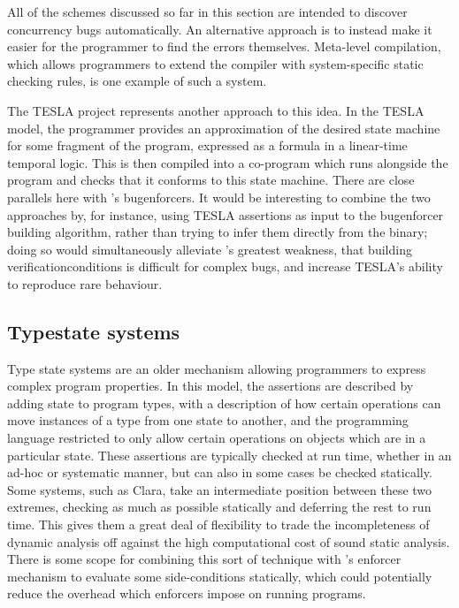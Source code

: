 All of the schemes discussed so far in this section are intended to
discover concurrency bugs automatically.  An alternative approach is
to instead make it easier for the programmer to find the errors
themselves.  Meta-level compilation\cite{Engler2000a}, which allows
programmers to extend the compiler with system-specific static
checking rules, is one example of such a system.

The TESLA project\cite{Watson2013}
represents another approach to this idea.  In the TESLA model, the
programmer provides an approximation of the desired state machine for
some fragment of the program, expressed as a formula in a linear-time
temporal logic.  This is then compiled into a co-program which runs
alongside the program and checks that it conforms to this state
machine.  There are close parallels here with {\technique}'s
\glspl{bugenforcer}.  It would be interesting to combine the two
approaches by, for instance, using TESLA assertions as input to the
\gls{bugenforcer} building algorithm, rather than trying to infer them
directly from the binary; doing so would simultaneously alleviate
{\technique}'s greatest weakness, that building
\glspl{verificationcondition} is difficult for complex bugs, and
increase TESLA's ability to reproduce rare behaviour.

\subsection{Typestate systems}

Type state systems\cite{Strom1986a} are an older mechanism allowing
programmers to express complex program properties.  In this model, the
assertions are described by adding state to program types, with a
description of how certain operations can move instances of a type
from one state to another, and the programming language restricted to
only allow certain operations on objects which are in a particular
state.  These assertions are typically checked at run
time\cite{Wolff2011}, whether in an
ad-hoc\cite[pages~305--314]{Gamma1995} or systematic\cite{Aldrich2009}
manner, but can also in some cases be checked
statically\cite{Lam2005}.  Some systems, such as
Clara\cite{Bodden2010}, take an intermediate position between these
two extremes, checking as much as possible statically and deferring
the rest to run time.  This gives them a great deal of flexibility to
trade the incompleteness of dynamic analysis off against the high
computational cost of sound static analysis.  There is some scope for
combining this sort of technique with {\technique}'s enforcer
mechanism to evaluate some side-conditions statically, which could
potentially reduce the overhead which enforcers impose on running
programs.

